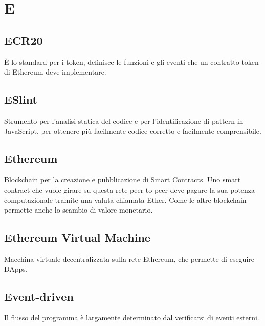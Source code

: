 \section*{E}
\subsection*{ECR20}
È lo standard per i token, definisce le funzioni e gli eventi che un contratto token di Ethereum deve implementare.

\subsection*{ESlint}
Strumento per l’analisi statica del codice e per l’identificazione di pattern in JavaScript, per ottenere più facilmente codice corretto e facilmente comprensibile.

\subsection*{Ethereum}
Blockchain per la creazione e pubblicazione di Smart Contracts. Uno smart contract che vuole girare su questa rete peer-to-peer deve pagare la sua potenza computazionale tramite una valuta chiamata Ether. Come le altre blockchain permette anche lo scambio di valore monetario.

\subsection*{Ethereum Virtual Machine}
Macchina virtuale decentralizzata sulla rete Ethereum, che permette di eseguire ÐApps.

\subsection*{Event-driven}
Il flusso del programma è largamente determinato dal verificarsi di eventi esterni.

